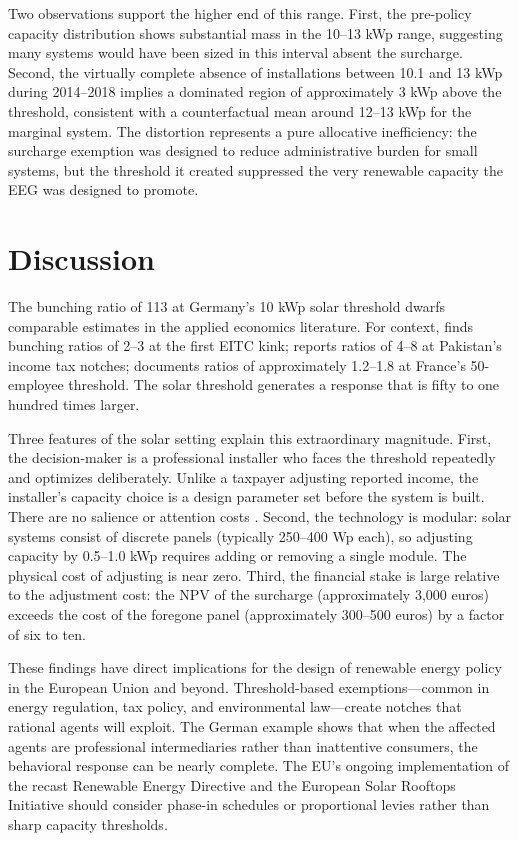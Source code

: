 \documentclass[12pt]{article}
\begin{document}
Two observations support the higher end of this range. First, the pre-policy capacity distribution shows substantial mass in the 10--13 kWp range, suggesting many systems would have been sized in this interval absent the surcharge. Second, the virtually complete absence of installations between 10.1 and 13 kWp during 2014--2018 implies a dominated region of approximately 3 kWp above the threshold, consistent with a counterfactual mean around 12--13 kWp for the marginal system. The distortion represents a pure allocative inefficiency: the surcharge exemption was designed to reduce administrative burden for small systems, but the threshold it created suppressed the very renewable capacity the EEG was designed to promote.


\section{Discussion}

The bunching ratio of 113 at Germany's 10 kWp solar threshold dwarfs comparable estimates in the applied economics literature. For context, \citet{saez2010taxpayers} finds bunching ratios of 2--3 at the first EITC kink; \citet{kleven2013using} reports ratios of 4--8 at Pakistan's income tax notches; \citet{garicano2016firm} documents ratios of approximately 1.2--1.8 at France's 50-employee threshold. The solar threshold generates a response that is fifty to one hundred times larger.

Three features of the solar setting explain this extraordinary magnitude. First, the decision-maker is a professional installer who faces the threshold repeatedly and optimizes deliberately. Unlike a taxpayer adjusting reported income, the installer's capacity choice is a design parameter set before the system is built. There are no salience or attention costs \citep{chetty2009salience}. Second, the technology is modular: solar systems consist of discrete panels (typically 250--400 Wp each), so adjusting capacity by 0.5--1.0 kWp requires adding or removing a single module. The physical cost of adjusting is near zero. Third, the financial stake is large relative to the adjustment cost: the NPV of the surcharge (approximately 3,000 euros) exceeds the cost of the foregone panel (approximately 300--500 euros) by a factor of six to ten.

These findings have direct implications for the design of renewable energy policy in the European Union and beyond. Threshold-based exemptions---common in energy regulation, tax policy, and environmental law---create notches that rational agents will exploit. The German example shows that when the affected agents are professional intermediaries rather than inattentive consumers, the behavioral response can be nearly complete. The EU's ongoing implementation of the recast Renewable Energy Directive and the European Solar Rooftops Initiative should consider phase-in schedules or proportional levies rather than sharp capacity thresholds.
\end{document}
